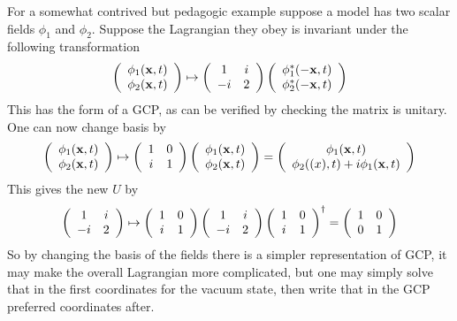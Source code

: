 For a somewhat contrived but pedagogic example suppose a model has two scalar fields $\phi_1$ and $\phi_2$. Suppose the Lagrangian they obey is invariant under the following transformation
\begin{align*}
\left( \begin{array}{c}
\phi_1(\mathbf{x},t) \\
\phi_2(\mathbf{x},t)
\end{array} \right) \mapsto \left( \begin{array}{c c}
1 & i \\
-i & 2  
\end{array} \right) \left( \begin{array}{c}
\phi_1^*(-\mathbf{x},t) \\
\phi_2^*(-\mathbf{x},t)
\end{array} \right)
\end{align*}
This has the form of a GCP, as can be verified by checking the matrix is unitary. One can now change basis by
\begin{align*}
\left( \begin{array}{c}
\phi_1(\mathbf{x},t) \\
\phi_2(\mathbf{x},t)
\end{array} \right) \mapsto \left( \begin{array}{c c}
1 & 0 \\
i & 1  
\end{array} \right) \left( \begin{array}{c}
\phi_1(\mathbf{x},t) \\
\phi_2(\mathbf{x},t)
\end{array} \right) = \left(
\begin{array}{c}
\phi_1(\mathbf{x},t) \\
\phi_2(\mathbf(x),t) + i \phi_1(\mathbf{x},t)
\end{array} \right)
\end{align*}
This gives the new $U$ by
\begin{align*}
\left( \begin{array}{c c}
1 & i \\
-i & 2  
\end{array} \right) \mapsto \left( \begin{array}{c c}
1 & 0 \\
i & 1  
\end{array} \right)\left( \begin{array}{c c}
1 & i \\
-i & 2  
\end{array} \right)\left( \begin{array}{c c}
1 & 0 \\
i & 1  
\end{array} \right)^\dagger 
= \left( \begin{array}{c c}
1 & 0 \\
0 & 1  
\end{array} \right)
\end{align*}
So by changing the basis of the fields there is a simpler representation of GCP, it may make the overall Lagrangian more complicated, but one may simply solve that in the first coordinates for the vacuum state, then write that in the GCP preferred coordinates after.

